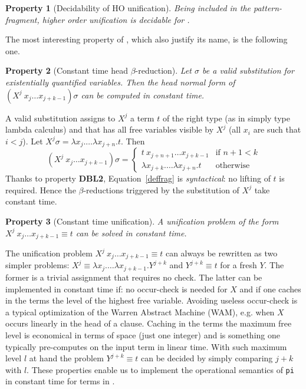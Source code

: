 \documentclass{llncs}
\newtheorem{myprop}{Property}
\begin{document}
\begin{myprop}[Decidability of HO unification]
Being \rff{} included in the pattern-fragment, higher order unification is
decidable for \rff{}.
\end{myprop}

The most interesting property of \rff{}, which also justify its name, is the
following one. 

\begin{myprop}[Constant time head $\beta$-reduction]
Let $\sigma$ be a \emph{valid} substitution for existentially quantified variables.  Then the head normal form of $(X^j~x_j \ldots x_{j+k-1}) \sigma$
can be computed in constant time.
\end{myprop}

A valid substitution assigns to $X^j$ a term $t$ of the right type (as in simply
type lambda calculus) and that has all free variables visible by $X^j$ (all
$x_i$ are such that $i < j$).  
Let $X^j \sigma = \lambda x_j. \ldots \lambda x_{j+n}.t$. Then
\begin{equation}\label{deffrag}(X^j~x_j \ldots x_{j+k-1}) \sigma
 = \left\{ \begin{array}{ll}
t~x_{j+n+1} \ldots x_{j+k-1} & \mbox{if $n+1 < k$} \\
\lambda x_{j+k}. \ldots \lambda x_{j+n}.t & \mbox{otherwise}
      \end{array} \right.\end{equation}
Thanks to property \textbf{DBL2}, Equation~\ref{deffrag} is
\emph{syntactical}: no lifting of $t$ is required.
Hence the $\beta$-reductions triggered by the substitution of $X^j$ take
constant time.

\begin{myprop}[Constant time unification]
A unification problem of the form  $X^j~x_j\ldots x_{j+k-1} \equiv t$
can be solved in constant time.
\end{myprop}

The unification problem $X^j~x_j\ldots x_{j+k-1} \equiv t$ can always be
rewritten as two simpler problems: $X^j \equiv \lambda x_j. \ldots \lambda x_{j+k-1}. Y^{j+k}$ and $Y^{j+k} \equiv t$ for a fresh $Y$.
The former is a trivial assignment that requires no check.
The latter can be implemented in constant time if: no occur-check is needed
for $X$ and if one caches in the terms the level of the highest free variable.
Avoiding useless occur-check is a typical optimization of the Warren Abstract
Machine (WAM), e.g. when $X$ occurs linearly in the head of a clause.
Caching in the terms the maximum free level is economical in terms of space
(just one integer) and is something one typically pre-computes on the input
term in linear time.  With such maximum level $l$ at hand the problem $Y^{j+k}
\equiv t$ can be decided by simply comparing $j+k$ with $l$.
These properties enable us to implement the operational semantics of \verb+pi+
in constant time for terms in \rff{}.
\end{document}
